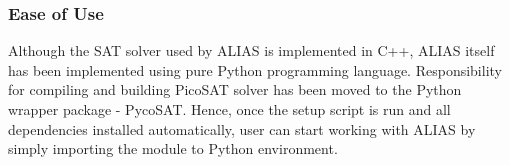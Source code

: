 \subsubsection{Ease of Use}
Although the SAT solver used by ALIAS is implemented in C++, ALIAS itself has been implemented using pure Python programming language. Responsibility for compiling and building PicoSAT solver has been moved to the Python wrapper package - PycoSAT. Hence, once the setup script is run and all dependencies installed automatically, user can start working with ALIAS by simply importing the module to Python environment.

